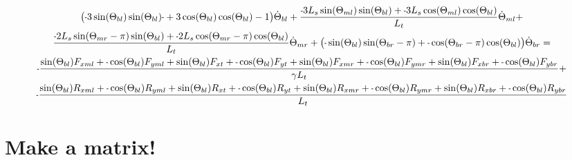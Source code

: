 \documentclass[11pt, landscape]{article}
\newcommand{\mn}{\scalebox{0.7}[1.0]{-}}
\begin{document}
\begin{multline}
\big(\mn 3\sin(\Theta_{bl})\sin(\Theta_{bl})\mn + 3\cos(\Theta_{bl})\cos(\Theta_{bl}) -1\big)\dot{\Theta}_{bl} +
\frac{\mn 3L_{s}\sin(\Theta_{ml})\sin(\Theta_{bl}) + \mn 3L_{s}\cos(\Theta_{ml})\cos(\Theta_{bl})}{L_t}\dot{\Theta}_{ml} + \\
\frac{\mn 2L_{s}\sin(\Theta_{mr}-\pi)\sin(\Theta_{bl}) + \mn 2L_{s}\cos(\Theta_{mr}-\pi)\cos(\Theta_{bl})}{L_t}\dot{\Theta}_{mr} +
\big(\mn \sin(\Theta_{bl}) \sin(\Theta_{br}-\pi) + \mn \cos(\Theta_{br}-\pi)\cos(\Theta_{bl})\big) \dot{\Theta}_{br} = \\
\mn \frac{\sin(\Theta_{bl})F_{xml} + \mn\cos(\Theta_{bl})F_{yml} + \sin(\Theta_{bl})F_{xt } + \mn \cos(\Theta_{bl})F_{yt } + \sin(\Theta_{bl})F_{xmr} + \mn \cos(\Theta_{bl})F_{ymr} + \sin(\Theta_{bl})F_{xbr} + \mn \cos(\Theta_{bl})F_{ybr}}{\gamma L_t} + \\
\mn \frac{\sin(\Theta_{bl})R_{xml} + \mn \cos(\Theta_{bl})R_{yml} + \sin(\Theta_{bl})R_{xt } + \mn \cos(\Theta_{bl})R_{yt} + \sin(\Theta_{bl})R_{xmr} + \mn \cos(\Theta_{bl})R_{ymr} + \sin(\Theta_{bl})R_{xbr} + \mn \cos(\Theta_{bl})R_{ybr}}{L_t}
\end{multline}

\section{Make a matrix!}
\end{document}
